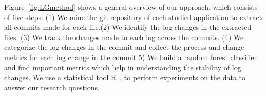  







Figure~\ref{fig:LGmethod} shows a general overview of our approach, which consists of five steps: (1) We mine the git repository of each studied application to extract all commits made for each file.(2) We identify the log changes in the extracted files. (3) We track the changes made to each log across the commits. (4) We categorize the log changes in the commit and collect the process and change metrics for each log change in the commit 5) We build a random forest classifier and find important metrics which help in understanding the stability of log changes.  We use a statistical tool R~\cite{ihaka1996r}, to perform experiments on the data to answer our research questions. 

